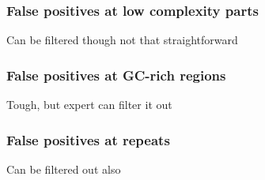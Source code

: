 \documentclass{beamer}
\begin{document}
\begin{frame}
\frametitle{False positives at low complexity parts}
Can be filtered though not that straightforward
\end{frame}

\begin{frame}
\frametitle{False positives at GC-rich regions}
Tough, but expert can filter it out
\end{frame}

\begin{frame}
\frametitle{False positives at repeats}
Can be filtered out also
\end{frame}
\end{document}
